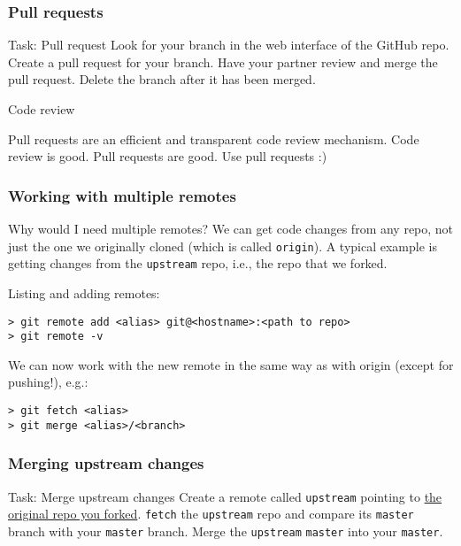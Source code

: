 
\begin{frame}[fragile]
	
\frametitle{Pull requests}
	
\begin{block}{Task: Pull request}
Look for your branch in the web interface of the GitHub repo. Create a pull request for your branch. Have your partner review and merge the pull request. Delete the branch after it has been merged.
\end{block}	

\begin{block}{Code review}

Pull requests are an efficient and transparent code review mechanism. Code review is good. Pull requests are good. Use pull requests :)
\end{block}

\end{frame}


\begin{frame}[fragile]
	
\frametitle{Working with multiple remotes}
	
\begin{block}{Why would I need multiple remotes?}
We can get code changes from any repo, not just the one we originally cloned (which is called \texttt{origin}). A typical example is getting changes from the \texttt{upstream} repo, i.e., the repo that we forked.
\end{block}	

Listing and adding remotes:
\begin{verbatim}
> git remote add <alias> git@<hostname>:<path to repo>	
> git remote -v	
\end{verbatim}
	
We can now work with the new remote in the same way as with origin (except for pushing!), e.g.:
\begin{verbatim}
> git fetch <alias>
> git merge <alias>/<branch>
\end{verbatim}
	
\end{frame}


\begin{frame}

\frametitle{Merging upstream changes}

\begin{block}{Task: Merge upstream changes}
Create a remote called \texttt{upstream} pointing to \href{https://github.com/larics/git-tutorial-code.git}{the original repo you forked}. \texttt{fetch} the \texttt{upstream} repo and compare its \texttt{master} branch with your \texttt{master} branch. Merge the \texttt{upstream} \texttt{master} into your \texttt{master}.
\end{block}

\end{frame}

